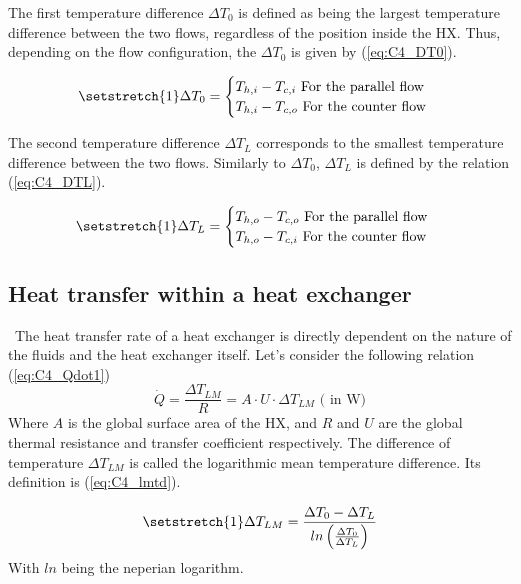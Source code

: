 The first temperature difference \(\Delta T_0\) is defined as being the largest temperature difference between the two flows, regardless of the position inside the HX. Thus, depending on the flow configuration, the \(\Delta T_0\) is given by (\ref{eq:C4_DT0}).

\begin{equation}
    \setstretch{1}
    \Delta T_0 =
    \begin{cases}
        T_{h,i} - T_{c,i} \text{ For the parallel flow} \\
        T_{h,i} - T_{c,o} \text{ For the counter flow}  \\
    \end{cases}\label{eq:C4_DT0}
\end{equation}

The second temperature difference \(\Delta T_L\) corresponds to the smallest temperature difference between the two flows. Similarly to \(\Delta T_0\), \(\Delta T_L\) is defined by the relation (\ref{eq:C4_DTL}).

\begin{equation}
    \setstretch{1}
    \Delta T_L =
    \begin{cases}
        T_{h,o} - T_{c,o} \text{ For the parallel flow} \\
        T_{h,o} - T_{c,i} \text{ For the counter flow}  \\
    \end{cases}\label{eq:C4_DTL}
\end{equation}

\subsection{Heat transfer within a heat exchanger}
\quad\ The heat transfer rate of a heat exchanger is directly dependent on the nature of the fluids and the heat exchanger itself. Let's consider the following relation (\ref{eq:C4_Qdot1})
\begin{equation}
    \dot{Q} = \frac{\Delta T_{LM}}{R}= A\cdot U\cdot \Delta T_{LM}\text{ ( in W)}\label{eq:C4_Qdot1}
\end{equation}
Where \(A\) is the global surface area of the HX, and \(R\) and \(U\) are the global thermal resistance and transfer coefficient respectively. The difference of temperature \(\Delta T_{LM}\) is called the logarithmic mean temperature difference. Its definition is (\ref{eq:C4_lmtd}).


\begin{equation}
    \setstretch{1}
    \Delta T_{LM} = \frac{\Delta T_0-\Delta T_L}{ln\left(\frac{\Delta T_0}{\Delta T_L}\right)}\label{eq:C4_lmtd}
\end{equation}
With \(ln\) being the neperian logarithm.
